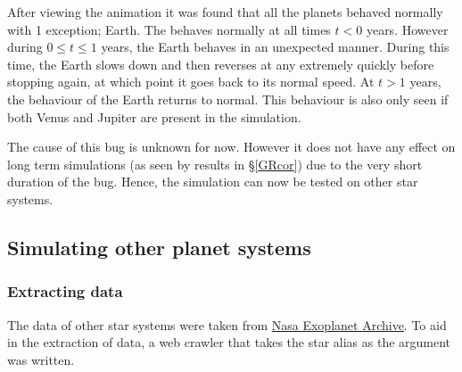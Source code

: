 \documentclass[11pt, oneside]{article}   	%
\begin{document}
After viewing the animation it was found that all the planets behaved normally with 1 exception; Earth. The behaves normally at all times $t < 0$ years. However during $0 \leq t \leq 1$ years, the Earth behaves in an unexpected manner. During this time, the Earth slows down and then reverses at any extremely quickly before stopping again, at which point it goes back to its normal speed. At $t > 1$ years, the behaviour of the Earth returns to normal. This behaviour is also only seen if both Venus and Jupiter are present in the simulation.

The cause of this bug is unknown for now. However it does not have any effect on long term simulations (as seen by results in \S\ref{GRcor}) due to the very short duration of the bug. Hence, the simulation can now be tested on other star systems.

\subsection{Simulating other planet systems}

\subsubsection{Extracting data}


The data of other star systems were taken from \href{https://exoplanetarchive.ipac.caltech.edu/}{Nasa Exoplanet Archive}. To aid in the extraction of data, a web crawler that takes the star alias as the argument was written.
\end{document}
